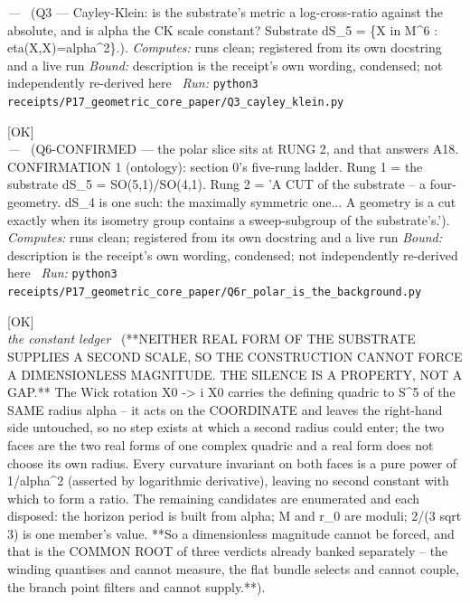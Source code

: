 \begin{description}
\textit{---} \ (Q3 --- Cayley-Klein: is the substrate's metric a log-cross-ratio against the absolute, and is alpha the CK scale constant? Substrate dS\_5 = \{X in M\textasciicircum{}6 : eta(X,X)=alpha\textasciicircum{}2\}.). 
\emph{Computes:} runs clean; registered from its own docstring and a live run
 \emph{Bound:} description is the receipt's own wording, condensed; not independently re-derived here
\ \emph{Run:} \texttt{python3 receipts/P17\_geometric\_core\_paper/Q3\_cayley\_klein.py}
\item[\rcptlabel{Q6r_polar_is_the_background}{P17R13}\textbf{P17R13}\quad\texttt{Q6r\_polar\_is\_the\_background}]\hfill\textsf{[OK]}\\
\textit{---} \ (Q6-CONFIRMED --- the polar slice sits at RUNG 2, and that answers A18. CONFIRMATION 1 (ontology): section 0's five-rung ladder. Rung 1 = the substrate dS\_5 = SO(5,1)/SO(4,1). Rung 2 = 'A CUT of the substrate -- a four-geometry. dS\_4 is one such: the maximally symmetric one... A geometry is a cut exactly when its isometry group contains a sweep-subgroup of the substrate's.'). 
\emph{Computes:} runs clean; registered from its own docstring and a live run
 \emph{Bound:} description is the receipt's own wording, condensed; not independently re-derived here
\ \emph{Run:} \texttt{python3 receipts/P17\_geometric\_core\_paper/Q6r\_polar\_is\_the\_background.py}
\item[\rcptlabel{P17_no_second_scale_on_either_face}{P17R14}\textbf{P17R14}\quad\texttt{P17\_no\_second\_scale\_on\_either\_face}]\hfill\textsf{[OK]}\\
\textit{the constant ledger} \ (**NEITHER REAL FORM OF THE SUBSTRATE SUPPLIES A SECOND SCALE, SO THE CONSTRUCTION CANNOT FORCE A DIMENSIONLESS MAGNITUDE. THE SILENCE IS A PROPERTY, NOT A GAP.** The Wick rotation X0 -> i X0 carries the defining quadric to S\textasciicircum{}5 of the SAME radius alpha -- it acts on the COORDINATE and leaves the right-hand side untouched, so no step exists at which a second radius could enter; the two faces are the two real forms of one complex quadric and a real form does not choose its own radius. Every curvature invariant on both faces is a pure power of 1/alpha\textasciicircum{}2 (asserted by logarithmic derivative), leaving no second constant with which to form a ratio. The remaining candidates are enumerated and each disposed: the horizon period is built from alpha; M and r\_0 are moduli; 2/(3 sqrt 3) is one member's value. **So a dimensionless magnitude cannot be forced, and that is the COMMON ROOT of three verdicts already banked separately -- the winding quantises and cannot measure, the flat bundle selects and cannot couple, the branch point filters and cannot supply.**). 

\end{description}
